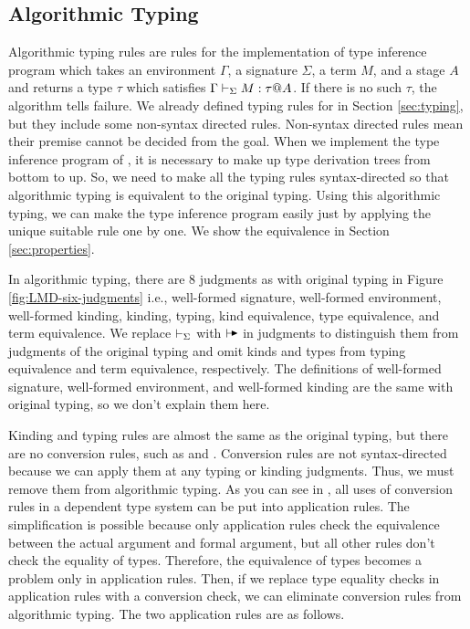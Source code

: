 \subsection{Algorithmic Typing}



Algorithmic typing rules are rules for the implementation of type inference
program which takes an environment \( \Gamma \), a signature \( \Sigma \), a
term \( M \), and a stage \( A \) and returns a type \( \tau \) which satisfies
\( \Gamma \vdash_\Sigma M : \tau @ A \). If there is no such \( \tau \), the algorithm tells
failure.  We already defined typing rules for \LMD in Section \ref{sec:typing},
but they include some non-syntax directed rules. Non-syntax directed rules mean
their premise cannot be decided from the goal. When we implement the type
inference program of \LMD, it is necessary to make up type derivation trees
from bottom to up.  So, we need to make all the typing rules syntax-directed so
that algorithmic typing is equivalent to the original typing. Using this
algorithmic typing, we can make the type inference program easily just by
applying the unique suitable rule one by one. We show the equivalence in
Section \ref{sec:properties}.


In algorithmic typing, there are 8 judgments as with original typing in Figure
\ref{fig:LMD-six-judgments} i.e., well-formed signature, well-formed
environment, well-formed kinding, kinding, typing, kind equivalence, type
equivalence, and term equivalence. We replace \( \vdash_\Sigma \) with \( \AV \) in
judgments to distinguish them from judgments of the original typing and omit
kinds and types from typing equivalence and term equivalence, respectively. The
definitions of well-formed signature, well-formed environment, and well-formed
kinding are the same with original typing, so we don't explain them here.


Kinding and typing rules are almost the same as the original typing, but there
are no conversion rules, such as \TConv and \KConv. Conversion rules are not
syntax-directed because we can apply them at any typing or kinding judgments.
Thus, we must remove them from algorithmic typing.  As you can see in
\cite{attapl}, all uses of conversion rules in a dependent type system can be
put into application rules. The simplification is possible because only
application rules check the equivalence between the actual argument and formal
argument, but all other rules don't check the equality of types. Therefore, the
equivalence of types becomes a problem only in application rules. Then, if we
replace type equality checks in application rules with a conversion check, we
can eliminate conversion rules from algorithmic typing. The two application
rules are as follows.

